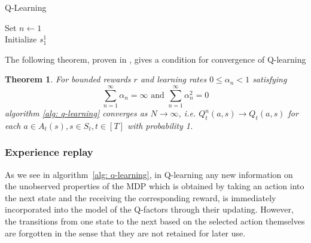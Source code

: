 \documentclass[a4paper,12pt]{article}
\newtheorem{theorem}[definition]{Theorem}
\begin{document}
\begin{algorithm}
\caption{Q-Learning}\label{alg: q-learning}
Set $n \gets 1$ \\
Initialize $s^1_1$
\end{algorithm}

The following theorem, proven in \cite{watkins1992q}, gives a condition for convergence of Q-learning
\begin{theorem}
    For bounded rewards $r$ and learning rates $0 \leq \alpha_n < 1$ satisfying
    \begin{equation*}
        \sum_{n=1}^\infty \alpha_n = \infty \text{ and } \sum_{n=1}^\infty \alpha^2_n = 0
    \end{equation*}
    algorithm \ref{alg: q-learning} converges as $N\to\infty$, i.e.  $Q^n_t(a, s) \to Q_t(a, s)$ for each $a\in A_t(s), s\in S_t, t\in [T]$ with probability 1.
\end{theorem}


\subsubsection{Experience replay}

As we see in algorithm~\ref{alg: q-learning}, in Q-learning any new information on the unobserved properties of the MDP which is obtained by taking an action into the next state and the receiving the corresponding reward, is immediately incorporated into the model of the Q-factors through their updating. However, the transitions from one state to the next based on the selected action themselves are forgotten in the sense that they are not retained for later use.
\end{document}
